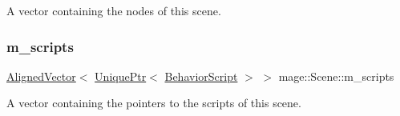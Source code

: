 A vector containing the nodes of this scene. \hypertarget{classmage_1_1_scene_ae57ca3aeb6b0d8b2cb8cf40334b883f8}{}\label{classmage_1_1_scene_ae57ca3aeb6b0d8b2cb8cf40334b883f8} 
\subsubsection{\texorpdfstring{m\+\_\+scripts}{m\_scripts}}
{\footnotesize\ttfamily \hyperlink{namespacemage_a8664bfb5ce2179fc64eae9f82c8a5ba8}{Aligned\+Vector}$<$ \hyperlink{namespacemage_a3316d7143a973e37adf1110f2e80ca31}{Unique\+Ptr}$<$ \hyperlink{classmage_1_1_behavior_script}{Behavior\+Script} $>$ $>$ mage\+::\+Scene\+::m\+\_\+scripts\hspace{0.3cm}{\ttfamily [private]}}

A vector containing the pointers to the scripts of this scene. 